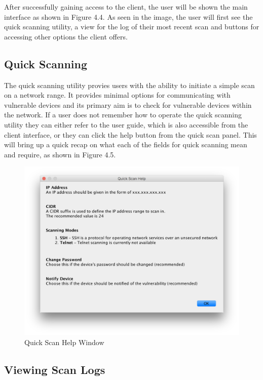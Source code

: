 After successfully gaining access to the client, the user will be shown the main interface as shown in Figure 4.4. As seen in the image, the user will first see the quick scanning utility, a view for the log of their most recent scan and buttons for accessing other options the client offers.

\subsection{Quick Scanning}

The quick scanning utility provies users with the ability to initiate a simple scan on a network range. It provides minimal options for communicating with vulnerable devices and its primary aim is to check for vulnerable devices within the network. If a user does not remember how to operate the quick scanning utility they can either refer to the user guide, which is also accessible from the client interface, or they can click the help button from the quick scan panel. This will bring up a quick recap on what each of the fields for quick scanning mean and require, as shown in Figure 4.5.

\begin{figure}[h]
	\centering
	\includegraphics[width=1\linewidth]{img/quick_scan_help_screenshot.png}
	\caption{Quick Scan Help Window}
\end{figure}

\subsection{Viewing Scan Logs}

